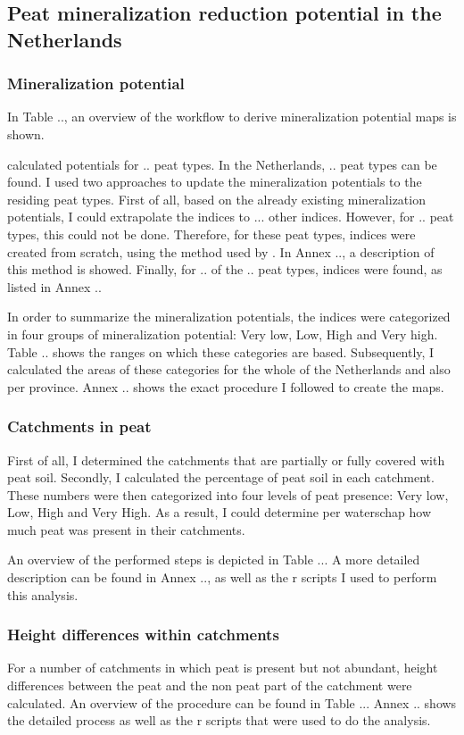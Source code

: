 \documentclass[a4paper,12pt]{scrbook}
\begin{document}
\subsection{Peat mineralization reduction potential in the Netherlands}

\subsubsection{Mineralization potential}
In Table .., an overview of the workflow to derive mineralization potential maps is shown.

\citet{stouthamer2008toelichting} calculated potentials for .. peat types. In the Netherlands, .. peat types can be found. I used two approaches to update the mineralization potentials to the residing peat types. First of all, based on the already existing mineralization potentials, I could extrapolate the indices to ... other indices. However, for .. peat types, this could not be done. Therefore, for these peat types, indices were created from scratch, using the method used by \citet{stouthamer2008toelichting}. In Annex .., a description of this method is showed. Finally, for .. of the .. peat types, indices were found, as listed in Annex .. 

In order to summarize the mineralization potentials, the indices were categorized in four groups of mineralization potential: Very low, Low, High and Very high. Table .. shows the ranges on which these categories are based. Subsequently, I calculated the areas of these categories for the whole of the Netherlands and also per province. Annex .. shows the exact procedure I followed to create the maps.

\subsubsection{Catchments in peat}
First of all, I determined the catchments that are partially or fully covered with peat soil. Secondly, I calculated the percentage of peat soil in each catchment. These numbers were then categorized into four levels of peat presence: Very low, Low, High and Very High. As a result, I could determine per waterschap how much peat was present in their catchments.

An overview of the performed steps is depicted in Table ... A more detailed description can be found in Annex .., as well as the r scripts I used to perform this analysis.

\subsubsection{Height differences within catchments}
For a number of catchments in which peat is present but not abundant, height differences between the peat and the non peat part of the catchment were calculated. An overview of the procedure can be found in Table ... Annex .. shows the detailed process as well as the r scripts that were used to do the analysis.
\end{document}
